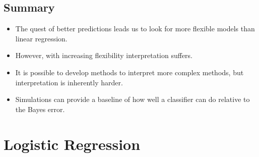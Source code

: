 \documentclass[12pt, oneside]{article}
\begin{document}
\subsection{Summary}
\begin{itemize}
    \item The quest of better predictions leads us to look for more flexible models than linear regression.
    \item However, with increasing flexibility interpretation suffers.
    \item It is possible to develop methods to interpret more complex methods, but interpretation is inherently harder.
    \item Simulations can provide a baseline of how well a classifier can do relative to the Bayes error.
\end{itemize}



\newpage

\section{Logistic Regression}
\end{document}
